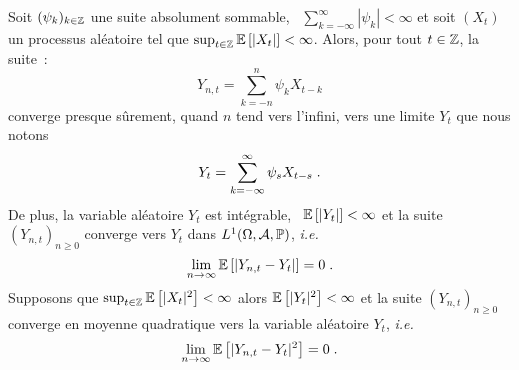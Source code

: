 \begin{theorem}
 \label{theo:filtragepassl}
 Soit $(\psi_k)_{k\in\mathbb{Z}}$ une suite absolument sommable, \ie\ $\sum_{k= -\infty}^\infty |\psi_k| < \infty$
et soit $(X_{t})$ un processus al\'eatoire tel que $\sup_{t \in \mathbb{Z}} {\mathbb E}\left[ |X_{t}| \right] < \infty$.
Alors, pour tout $t \in \mathbb{Z}$, la suite~:
\[
Y_{n,t} = \sum_{k=-n}^n \psi_k X_{t-k}
\]
converge presque s\^urement, quand $n$ tend vers l'infini, vers
une limite $Y_t$ que nous notons
$$
Y_{t} = \sum_{k=-\infty}^\infty \psi_s X_{t-s}\;.
$$
De plus, la variable al\'eatoire $Y_t$ est int\'egrable, \ie\ ${\mathbb E}\left[ |Y_t| \right] < \infty$ et la suite $(Y_{n,t})_{n \geq 0}$
converge vers $Y_t$ dans  $L^1(\Omega,\mathcal{A},\mathbb{P})$, \textit{i.e.}
$$
\lim_{n \rightarrow \infty} {\mathbb E}\left[  |Y_{n,t} - Y_{t}| \right] = 0 \;.
$$
Supposons que $\sup_{t \in \mathbb{Z}} {\mathbb E}\left[ |X_t|^2 \right] < \infty$ alors
${\mathbb E}\left[ |Y_{t}|^2 \right] < \infty$ et la suite $(Y_{n,t})_{n \geq 0}$ converge en moyenne quadratique vers la variable
al\'eatoire $Y_{t}$, \textit{i.e.}
$$
\lim_{n \rightarrow \infty} {\mathbb E}\left[ |Y_{n,t} - Y_{t}|^2 \right] = 0 \;.
$$
\end{theorem}
